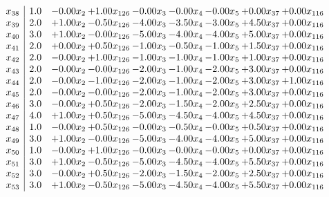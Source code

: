 \documentclass[8pt]{article}
\begin{document}
\[\begin{array}{c| c c@{\hskip 2pt} c@{\hskip 2pt} c@{\hskip 2pt} c@{\hskip 2pt} c@{\hskip 2pt} c@{\hskip 2pt} c@{\hskip 2pt} }
 x_{38}   &  1.0 & -0.00 x_{2} & +  1.00 x_{126} & -0.00 x_{3} & -0.00 x_{4} & -0.00 x_{5} & +  0.00 x_{37} & +  0.00 x_{116}\\
 x_{39}   &  2.0 & +  1.00 x_{2} & -0.50 x_{126} & -4.00 x_{3} & -3.50 x_{4} & -3.00 x_{5} & +  4.50 x_{37} & +  0.00 x_{116}\\
 x_{40}   &  3.0 & +  1.00 x_{2} & -0.00 x_{126} & -5.00 x_{3} & -4.00 x_{4} & -4.00 x_{5} & +  5.00 x_{37} & +  0.00 x_{116}\\
 x_{41}   &  2.0 & +  0.00 x_{2} & +  0.50 x_{126} & -1.00 x_{3} & -0.50 x_{4} & -1.00 x_{5} & +  1.50 x_{37} & +  0.00 x_{116}\\
 x_{42}   &  2.0 & -0.00 x_{2} & +  1.00 x_{126} & -1.00 x_{3} & -1.00 x_{4} & -1.00 x_{5} & +  1.00 x_{37} & +  0.00 x_{116}\\
 x_{43}   &  2.0 & -0.00 x_{2} & -0.00 x_{126} & -2.00 x_{3} & -1.00 x_{4} & -2.00 x_{5} & +  3.00 x_{37} & +  0.00 x_{116}\\
 x_{44}   &  2.0 & -0.00 x_{2} & -1.00 x_{126} & -2.00 x_{3} & -1.00 x_{4} & -2.00 x_{5} & +  3.00 x_{37} & +  1.00 x_{116}\\
 x_{45}   &  2.0 & -0.00 x_{2} & -0.00 x_{126} & -2.00 x_{3} & -1.00 x_{4} & -2.00 x_{5} & +  3.00 x_{37} & +  0.00 x_{116}\\
 x_{46}   &  3.0 & -0.00 x_{2} & +  0.50 x_{126} & -2.00 x_{3} & -1.50 x_{4} & -2.00 x_{5} & +  2.50 x_{37} & +  0.00 x_{116}\\
 x_{47}   &  4.0 & +  1.00 x_{2} & +  0.50 x_{126} & -5.00 x_{3} & -4.50 x_{4} & -4.00 x_{5} & +  4.50 x_{37} & +  0.00 x_{116}\\
 x_{48}   &  1.0 & -0.00 x_{2} & +  0.50 x_{126} & -0.00 x_{3} & -0.50 x_{4} & -0.00 x_{5} & +  0.50 x_{37} & +  0.00 x_{116}\\
 x_{49}   &  3.0 & +  1.00 x_{2} & -0.00 x_{126} & -5.00 x_{3} & -4.00 x_{4} & -4.00 x_{5} & +  5.00 x_{37} & +  0.00 x_{116}\\
 x_{50}   &  1.0 & -0.00 x_{2} & +  1.00 x_{126} & -0.00 x_{3} & -0.00 x_{4} & -0.00 x_{5} & +  0.00 x_{37} & +  0.00 x_{116}\\
 x_{51}   &  3.0 & +  1.00 x_{2} & -0.50 x_{126} & -5.00 x_{3} & -4.50 x_{4} & -4.00 x_{5} & +  5.50 x_{37} & +  0.00 x_{116}\\
 x_{52}   &  3.0 & -0.00 x_{2} & +  0.50 x_{126} & -2.00 x_{3} & -1.50 x_{4} & -2.00 x_{5} & +  2.50 x_{37} & +  0.00 x_{116}\\
 x_{53}   &  3.0 & +  1.00 x_{2} & -0.50 x_{126} & -5.00 x_{3} & -4.50 x_{4} & -4.00 x_{5} & +  5.50 x_{37} & +  0.00 x_{116}\\

\end{array}\]
\end{document}
